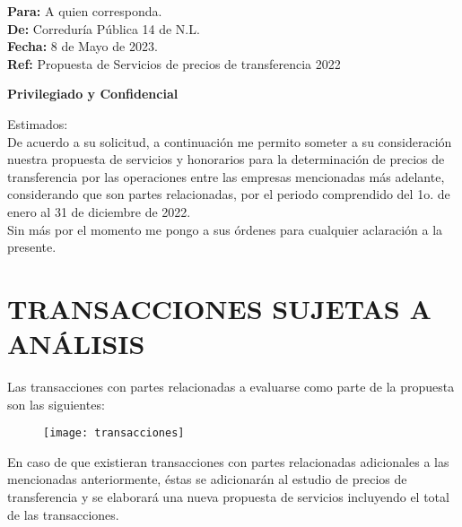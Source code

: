 \documentclass[5pt,letter]{report}
\begin{document}
\begin{minipage}{12cm}

\textbf{Para:}		A quien corresponda.\\[5pt]

\textbf{De:}		Correduría Pública 14 de N.L.\\[5pt]

\textbf{Fecha:}	8 de Mayo de 2023.\\[5pt]

\textbf{Ref:} 		Propuesta de Servicios de precios de transferencia 2022

\end{minipage}

\begin{center}
\vspace{20pt}
\textcolor{principal}{\textbf{Privilegiado y Confidencial}}
\end{center}

Estimados:\\[5pt]

De acuerdo a su solicitud, a continuación me permito someter a su consideración nuestra propuesta de servicios y honorarios para la determinación de precios de transferencia por las operaciones entre las empresas mencionadas más adelante, considerando que son partes relacionadas, por el periodo comprendido del 1o. de enero al 31 de diciembre de 2022.\\[5pt]

Sin más por el momento me pongo a sus órdenes para cualquier aclaración a la presente.\\[5pt] 

\section{TRANSACCIONES SUJETAS A ANÁLISIS}

Las transacciones con partes relacionadas a evaluarse como parte de la propuesta son las siguientes: \\

\begin{figure}[H]
\centering
\texttt{[image: transacciones]}
\end{figure}


En caso de que existieran transacciones con partes relacionadas adicionales a las mencionadas anteriormente, éstas se adicionarán al estudio de precios de transferencia y se elaborará una nueva propuesta de servicios incluyendo el total de las transacciones.
\end{document}
